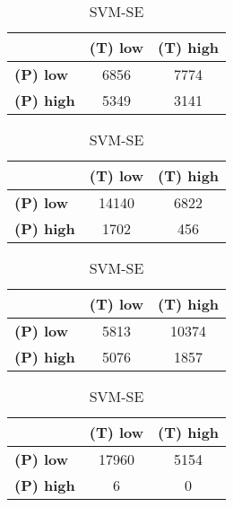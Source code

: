 \begin{landscape}
\begin{table}[htbp]
\centering
\caption{PCA_HoE__01 Female}
\begin{minipage}{.3\textwidth}
\tiny
\caption*{SVM-AP}
\begin{tabular}{|l|c|c|}
\hline
          & \textbf{(T) low}  & \textbf{(T) high} \\ \hline
\textbf{(P) low}  & 6856        & 7774        \\ \hline
\textbf{(P) high} & 5349        & 3141        \\ \hline
\end{tabular}
\end{minipage}\hfill
\begin{minipage}{.3\textwidth}
\tiny
\caption*{SVM-AT}
\begin{tabular}{|l|c|c|}
\hline
          & \textbf{(T) low}  & \textbf{(T) high} \\ \hline
\textbf{(P) low}  & 14140       & 6822        \\ \hline
\textbf{(P) high} & 1702        & 456       \\ \hline
\end{tabular}
\end{minipage}\hfill
\begin{minipage}{.3\textwidth}
\tiny
\caption*{SVM-PL}
\begin{tabular}{|l|c|c|}
\hline
          & \textbf{(T) low}  & \textbf{(T) high} \\ \hline
\textbf{(P) low}  & 5813        & 10374       \\ \hline
\textbf{(P) high} & 5076        & 1857        \\ \hline
\end{tabular}
\end{minipage}\hfill
\begin{minipage}{.3\textwidth}
\tiny
\caption*{SVM-SE}
\begin{tabular}{|l|c|c|}
\hline
          & \textbf{(T) low}  & \textbf{(T) high} \\ \hline
\textbf{(P) low}  & 17960       & 5154        \\ \hline
\textbf{(P) high} & 6         & 0       \\ \hline
\end{tabular}
\end{minipage}\hfill
\end{table}
\begin{table}[htbp]

\end{table}
\end{landscape}
